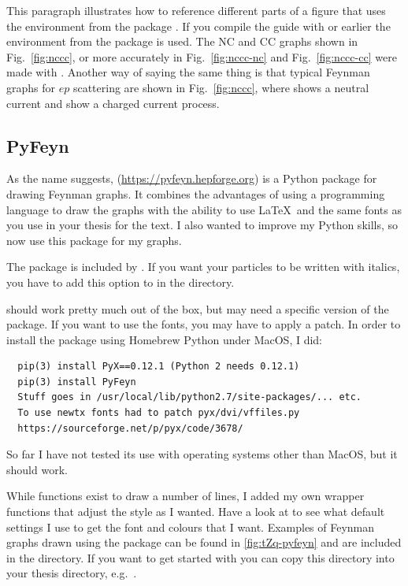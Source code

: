 This paragraph illustrates how to reference different parts of a
figure that uses the environment  from the package .
If you compile the guide with  or earlier the
environment  from the package  is used.
The NC and CC graphs shown in
Fig.~\ref{fig:nccc}, or more accurately in Fig.~\ref{fig:nccc-nc} and
Fig.~\ref{fig:nccc-cc} were made with . Another way of
saying the same thing is that typical Feynman graphs for $ep$
scattering are shown in Fig.~\ref{fig:nccc}, where
 shows a neutral current and 
show a charged current process.


\subsection{PyFeyn}
\label{sec:fig:pyfeyn}

As the name suggests,  (\url{https://pyfeyn.hepforge.org})
is a Python package for drawing Feynman graphs.
It combines the advantages of using a programming language to draw the graphs
with the ability to use \LaTeX\ and the same fonts as you use in your thesis
for the text.
I also wanted to improve my Python skills, 
so now use this package for my graphs.

The package  is included by .
If you want your particles to be written with italics,
you have to add this option to  in the  directory.

 should work pretty much out of the box,
but may need a specific version of the  package.
If you want to use the  fonts, you may have to apply a patch.
In order to install the package using Homebrew Python under MacOS, I did:
\begin{verbatim}
  pip(3) install PyX==0.12.1 (Python 2 needs 0.12.1)
  pip(3) install PyFeyn
  Stuff goes in /usr/local/lib/python2.7/site-packages/... etc.
  To use newtx fonts had to patch pyx/dvi/vffiles.py
  https://sourceforge.net/p/pyx/code/3678/    
\end{verbatim}
So far I have not tested its use with operating systems other than MacOS,
but it should work.

While functions exist to draw a number of lines, I added my own wrapper functions
that adjust the style as I wanted.
Have a look at  to see what default settings I use
to get the font and colours that I want.
Examples of Feynman graphs drawn using the package can be found in
\cref{fig:tZq-pyfeyn} and are included in the  directory.
If you want to get started with  you can copy this directory
into your thesis directory, e.g.\ .

